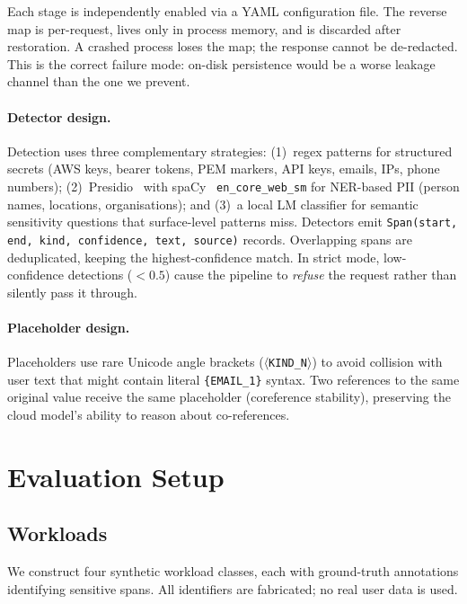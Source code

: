\documentclass[11pt,a4paper]{article}
\begin{document}
Each stage is independently enabled via a YAML configuration
file.  The reverse map is per-request, lives only in process
memory, and is discarded after restoration.  A crashed process
loses the map; the response cannot be de-redacted.  This is the
correct failure mode: on-disk persistence would be a worse
leakage channel than the one we prevent.

\paragraph{Detector design.}
Detection uses three complementary strategies:
(1)~regex patterns for structured secrets (AWS keys, bearer tokens,
PEM markers, API keys, emails, IPs, phone numbers);
(2)~Presidio~\cite{presidio} with spaCy~\cite{spacy}
\texttt{en\_core\_web\_sm} for NER-based PII (person names,
locations, organisations); and
(3)~a local LM classifier for semantic sensitivity questions
that surface-level patterns miss.
Detectors emit \texttt{Span(start, end, kind, confidence, text,
source)} records.  Overlapping spans are deduplicated, keeping the
highest-confidence match.  In strict mode, low-confidence
detections ($< 0.5$) cause the pipeline to \emph{refuse} the
request rather than silently pass it through.

\paragraph{Placeholder design.}
Placeholders use rare Unicode angle brackets
(\texttt{$\langle$KIND\_N$\rangle$})
to avoid collision with user text that might contain literal
\texttt{\{EMAIL\_1\}} syntax.  Two references to the same
original value receive the same placeholder (coreference
stability), preserving the cloud model's ability to reason about
co-references.

\section{Evaluation Setup}
\label{sec:eval}

\subsection{Workloads}

We construct four synthetic workload classes, each with
ground-truth annotations identifying sensitive spans.  All
identifiers are fabricated; no real user data is used.
\end{document}
